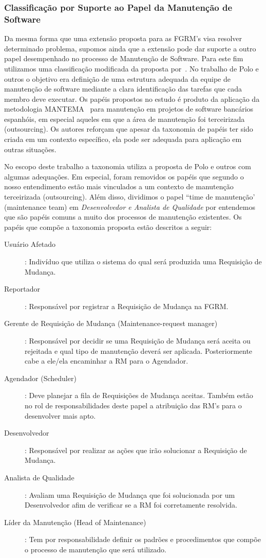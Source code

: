 \subsubsection{Classificação por Suporte ao Papel da Manutenção de Software}
\label{subsubsec:map-esquema-suporte-papel-man}

Da mesma forma que uma extensão proposta para as FGRM's visa resolver
determinado problema, supomos ainda que a extensão pode dar suporte a
outro papel desempenhado no processo de Manutenção de Software. Para este
fim utilizamos uma classificação modificada da proposta por~\cite{Polo1999}. No
trabalho de Polo e outros o objetivo era definição de uma estrutura adequada da
equipe de manutenção de software mediante a clara identificação das tarefas que
cada membro deve executar. Os papéis propostos no estudo é produto da
aplicação da metodologia MANTEMA~\cite{756695} para manutenção em projetos de
software bancários espanhóis, em especial aqueles em que a área de manutenção
foi terceirizada (outsourcing). Os autores reforçam que apesar da taxonomia de
papéis ter sido criada em um contexto específico, ela pode ser adequada para
aplicação em outras situações.

No escopo deste trabalho a taxonomia utiliza a proposta de Polo e outros com
algumas adequações. Em especial, foram removidos os papéis que segundo o nosso
entendimento estão mais vinculados a um contexto de manutenção terceirizada
(outsourcing). Além disso, dividimos o papel ``time de manutenção' (maintenance
team) em \textit{Desenvolvedor e Analista de Qualidade} por entendemos que são
papéis comuns a muito dos processos de manutenção existentes. Os papéis que
compõe a taxonomia proposta estão descritos a seguir:

\begin{description} 
	\item[Usuário Afetado]: Indivíduo que utiliza o sistema do
		qual será produzida uma Requisição de Mudança. 
   	\item[Reportador]:
		Responsável por registrar a Requisição de Mudança na FGRM\@.
	\item[Gerente de Requisição de Mudança (Maintenance-request manager)]:
		Res\-pon\-sá\-vel por decidir se uma Requisição de Mudança será aceita ou
		rejeitada e qual tipo de manutenção deverá ser aplicada. Posteriormente
		cabe a ele/ela encaminhar a RM para o Agendador. 
   	\item[Agendador
		(Scheduler)]: Deve planejar a fila de Requisições de Mudança aceitas.
		Também estão no rol de responsabilidades deste papel a atribuição das
		RM's para o desenvolver mais apto.
  	\item[Desenvolvedor]: Responsável por
		realizar as ações que irão solucionar a Requisição de Mudança.
	\item[Analista de Qualidade]: Avaliam uma Requisição de Mudança que foi
		solucionada por um Desenvolvedor afim de verificar se a RM foi
		corretamente resolvida.
  	\item[Líder da Manutenção (Head of
		Maintenance)]: Tem por responsabilidade definir os padrões e
		procedimentos que compõe o processo de manutenção que será utilizado.
\end{description}

